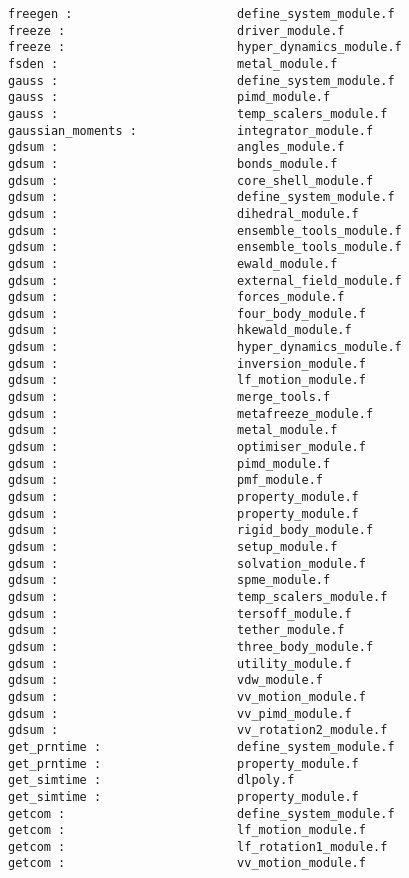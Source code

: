 \begin{verbatim}
freegen :                       define_system_module.f
freeze :                        driver_module.f
freeze :                        hyper_dynamics_module.f
fsden :                         metal_module.f
gauss :                         define_system_module.f
gauss :                         pimd_module.f
gauss :                         temp_scalers_module.f
gaussian_moments :              integrator_module.f
gdsum :                         angles_module.f
gdsum :                         bonds_module.f
gdsum :                         core_shell_module.f
gdsum :                         define_system_module.f
gdsum :                         dihedral_module.f
gdsum :                         ensemble_tools_module.f
gdsum :                         ensemble_tools_module.f
gdsum :                         ewald_module.f
gdsum :                         external_field_module.f
gdsum :                         forces_module.f
gdsum :                         four_body_module.f
gdsum :                         hkewald_module.f
gdsum :                         hyper_dynamics_module.f
gdsum :                         inversion_module.f
gdsum :                         lf_motion_module.f
gdsum :                         merge_tools.f
gdsum :                         metafreeze_module.f
gdsum :                         metal_module.f
gdsum :                         optimiser_module.f
gdsum :                         pimd_module.f
gdsum :                         pmf_module.f
gdsum :                         property_module.f
gdsum :                         property_module.f
gdsum :                         rigid_body_module.f
gdsum :                         setup_module.f
gdsum :                         solvation_module.f
gdsum :                         spme_module.f
gdsum :                         temp_scalers_module.f
gdsum :                         tersoff_module.f
gdsum :                         tether_module.f
gdsum :                         three_body_module.f
gdsum :                         utility_module.f
gdsum :                         vdw_module.f
gdsum :                         vv_motion_module.f
gdsum :                         vv_pimd_module.f
gdsum :                         vv_rotation2_module.f
get_prntime :                   define_system_module.f
get_prntime :                   property_module.f
get_simtime :                   dlpoly.f
get_simtime :                   property_module.f
getcom :                        define_system_module.f
getcom :                        lf_motion_module.f
getcom :                        lf_rotation1_module.f
getcom :                        vv_motion_module.f

\end{verbatim}
